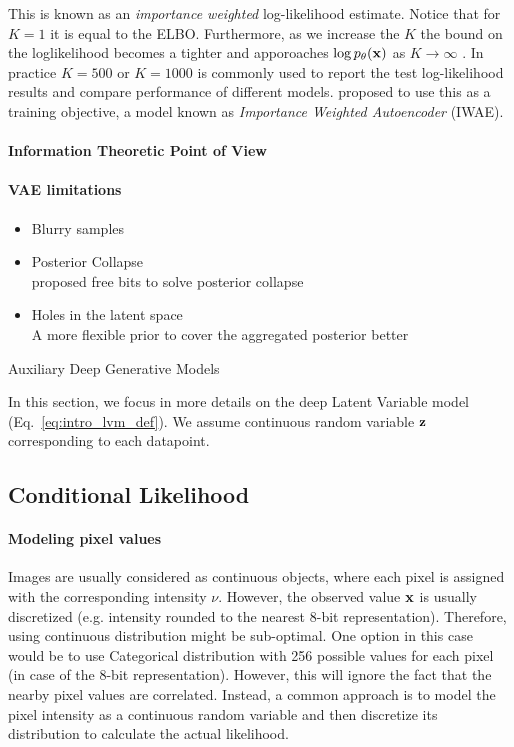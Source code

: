 This is known as an \textit{importance weighted} log-likelihood estimate. Notice that for $K=1$ it is equal to the ELBO. Furthermore, as we increase the $K$ the bound on the loglikelihood becomes a tighter and apporoaches $\log p_{\theta}({\mathbf{x}})$ as $K \rightarrow \infty$ \citep{burda2015importance}. In practice $K=500$ or $K=1000$ is commonly used to report the test log-likelihood results and compare performance of different models. \citet{burda2015importance} proposed to use this as a training objective, a model known as \textit{Importance Weighted Autoencoder} (IWAE). 

\paragraph{Information Theoretic Point of View}

\paragraph{VAE limitations}
\begin{itemize}
    \item Blurry samples \cite{Rybkin2020-je}
    \item Posterior Collapse \\
    \cite{kingma2016improved} proposed free bits to solve posterior collapse    
    \item Holes in the latent space\\
    A more flexible prior to cover the aggregated posterior better
\end{itemize}
 

Auxiliary Deep Generative Models \cite{maaloe2016auxiliary}

In this section, we focus in more details on the deep Latent Variable model (Eq.~\ref{eq:intro_lvm_def}). We assume  continuous random variable ${\mathbf{z}}$ corresponding to each datapoint. 

\subsection{Conditional Likelihood}
\paragraph{Modeling pixel values}
Images are usually considered as continuous objects, where each pixel is assigned with the corresponding intensity $\nu$. 
However, the observed value ${\mathbf{x}}$ is usually discretized (e.g. intensity rounded to the nearest 8-bit representation). 
Therefore, using continuous distribution might be sub-optimal.
One option in this case would be to use Categorical distribution with 256 possible values for each pixel (in case of the 8-bit representation). However, this will ignore the fact that the nearby pixel values are correlated. 
Instead, a common approach is to model the pixel intensity as a continuous random variable and then discretize its distribution to calculate the actual likelihood. 

